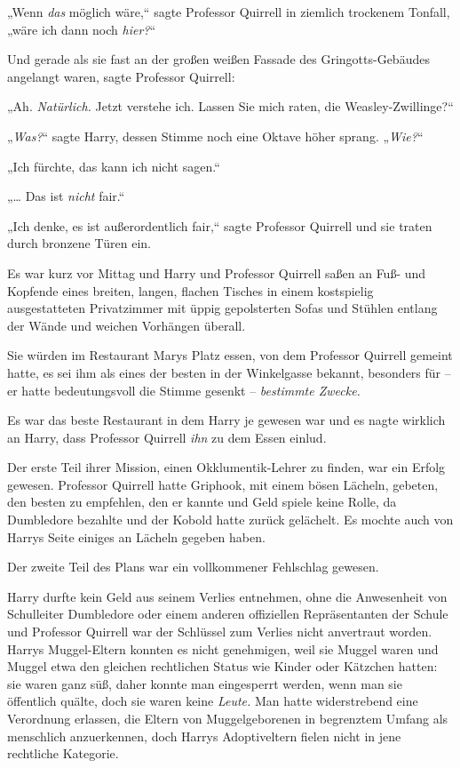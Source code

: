 {„Wenn \emph{das} möglich wäre,“ sagte Professor Quirrell in ziemlich trockenem Tonfall, „wäre ich dann noch \emph{hier?}“

Und gerade als sie fast an der großen weißen Fassade des Gringotts-Gebäudes angelangt waren, sagte Professor Quirrell:

„Ah. \emph{Natürlich.} Jetzt verstehe ich. Lassen Sie mich raten, die Weasley-Zwillinge?“

„\emph{Was?}“ sagte Harry, dessen Stimme noch eine Oktave höher sprang. „\emph{Wie?}“

„Ich fürchte, das kann ich nicht sagen.“

„… Das ist \emph{nicht} fair.“

„Ich denke, es ist außerordentlich fair,“ sagte Professor Quirrell und sie traten durch bronzene Türen ein.

\later

Es war kurz vor Mittag und Harry und Professor Quirrell saßen an Fuß- und Kopfende eines breiten, langen, flachen Tisches in einem kostspielig ausgestatteten Privatzimmer mit üppig gepolsterten Sofas und Stühlen entlang der Wände und weichen Vorhängen überall.

Sie würden im Restaurant Marys Platz essen, von dem Professor Quirrell gemeint hatte, es sei ihm als eines der besten in der Winkelgasse bekannt, besonders für -- er hatte bedeutungsvoll die Stimme gesenkt -- \emph{bestimmte Zwecke.}

Es war das beste Restaurant in dem Harry je gewesen war und es nagte wirklich an Harry, dass Professor Quirrell \emph{ihn} zu dem Essen einlud.

Der erste Teil ihrer Mission, einen Okklumentik-Lehrer zu finden, war ein Erfolg gewesen. Professor Quirrell hatte Griphook, mit einem bösen Lächeln, gebeten, den besten zu empfehlen, den er kannte und Geld spiele keine Rolle, da Dumbledore bezahlte und der Kobold hatte zurück gelächelt. Es mochte auch von Harrys Seite einiges an Lächeln gegeben haben.

Der zweite Teil des Plans war ein vollkommener Fehlschlag gewesen.

Harry durfte kein Geld aus seinem Verlies entnehmen, ohne die Anwesenheit von Schulleiter Dumbledore oder einem anderen offiziellen Repräsentanten der Schule und Professor Quirrell war der Schlüssel zum Verlies nicht anvertraut worden. Harrys Muggel-Eltern konnten es nicht genehmigen, weil sie Muggel waren und Muggel etwa den gleichen rechtlichen Status wie Kinder oder Kätzchen hatten: sie waren ganz süß, daher konnte man eingesperrt werden, wenn man sie öffentlich quälte, doch sie waren keine \emph{Leute.} Man hatte widerstrebend eine Verordnung erlassen, die Eltern von Muggelgeborenen in begrenztem Umfang als menschlich anzuerkennen, doch Harrys Adoptiveltern fielen nicht in jene rechtliche Kategorie.

}
